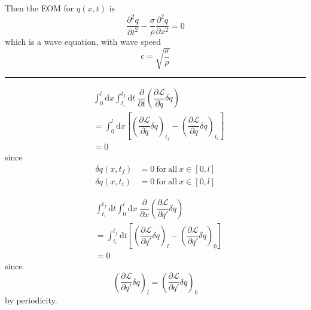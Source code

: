 \documentclass{article}
\begin{document}
\noindent Then the EOM for $q( x, t )$ is
\begin{equation*}
    \dfrac{ \partial^2 q }{ \partial t^2 } - \dfrac{\sigma}{\rho} \dfrac{ \partial^2 q }{ \partial x^2 } = 0
\end{equation*}
which is a wave equation, with wave speed
\begin{equation*}
    c = \sqrt{ \dfrac{\sigma}{\rho} }
\end{equation*}

\noindent\rule{\textwidth}{.5pt}

\begin{align*}
    & \int_0^l \mathrm{d}x \int_{t_i}^{t_f} \mathrm{d}t~ \dfrac{ \partial }{ \partial t } \left( \dfrac{ \partial \mathscr{L} }{ \partial \dot{q} } \delta q \right) \\
    &= \int_0^l \mathrm{d}x \left[ \left( \dfrac{ \partial \mathscr{L} }{ \partial \dot{q} } \delta q \right)_{t_f} - \left( \dfrac{ \partial \mathscr{L} }{ \partial \dot{q} } \delta q \right)_{t_i} \right] \\
    &= 0
\end{align*}
since
\begin{align*}
    \delta q ( x, t_f ) &= 0 \mathrm{~ for ~ all ~} x \in [ 0, l ] \\
    \delta q ( x, t_i ) &= 0 \mathrm{~ for ~ all ~} x \in [ 0, l ]
\end{align*}

\begin{align*}
    & \int_{t_i}^{t_f} \mathrm{d}t \int_0^l \mathrm{d}x~ \dfrac{ \partial }{ \partial x } \left( \dfrac{ \partial \mathscr{L} }{ \partial q' } \delta q \right) \\
    &= \int_{t_i}^{t_f} \mathrm{d}t \left[ \left( \dfrac{ \partial \mathscr{L} }{ \partial q' } \delta q \right)_l - \left( \dfrac{ \partial \mathscr{L} }{ \partial q' } \delta q \right)_0 \right] \\
    &= 0
\end{align*}
since
\begin{equation*}
    \left( \dfrac{ \partial \mathscr{L} }{ \partial q' } \delta q \right)_l = \left( \dfrac{ \partial \mathscr{L} }{ \partial q' } \delta q \right)_0
\end{equation*}
by periodicity.
\end{document}

